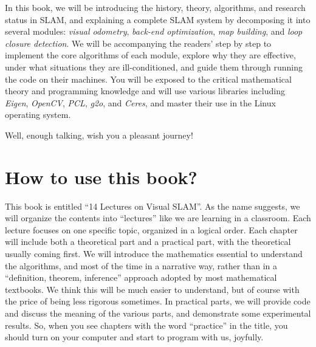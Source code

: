 In this book, we will be introducing the history, theory, algorithms, and research status in SLAM, and explaining a complete SLAM system by decomposing it into several modules: \textit{visual odometry}, \textit{back-end optimization}, \textit{map building}, and \textit{loop closure detection}. We will be accompanying the readers' step by step to implement the core algorithms of each module, explore why they are effective, under what situations they are ill-conditioned, and guide them through running the code on their machines. You will be exposed to the critical mathematical theory and programming knowledge and will use various libraries including \textit{Eigen}, \textit{OpenCV}, \textit{PCL}, \textit{g2o}, and \textit{Ceres}, and master their use in the Linux operating system.

Well, enough talking, wish you a pleasant journey!

\section{How to use this book?}

This book is entitled ``14 Lectures on Visual SLAM''. As the name suggests, we will organize the contents into ``lectures'' like we are learning in a classroom. Each lecture focuses on one specific topic, organized in a logical order. Each chapter will include both a theoretical part and a practical part, with the theoretical usually coming first. We will introduce the mathematics essential to understand the algorithms, and most of the time in a narrative way, rather than in a ``definition, theorem, inference'' approach adopted by most mathematical textbooks. We think this will be much easier to understand, but of course with the price of being less rigorous sometimes. In practical parts, we will provide code and discuss the meaning of the various parts, and demonstrate some experimental results. So, when you see chapters with the word ``practice'' in the title, you should turn on your computer and start to program with us, joyfully.

